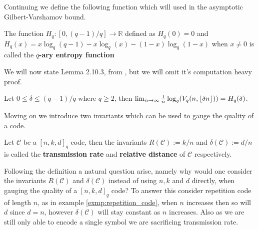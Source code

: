 Continuing we define the following function which will used in the asymptotic Gilbert-Varshamov bound.
\begin{definition}
  The function $H_q: [0, (q - 1)/q] \to \mathbb{R}$ defined as $H_q(0) = 0$ and $H_q(x) = x \log_{q}(q-1) - x \log_{q}(x) - (1-x)\log_q(1 - x)$ when $x \neq 0$ is called the \textbf{$q$-ary entropy function}
\end{definition}
We will now state Lemma 2.10.3, from \cite{huffman}, but we will omit it's computation heavy proof.
\begin{lemma}\label{lem:entropy_limit}
  Let $0 \leq \delta \leq (q - 1) / q$ where $q \geq 2$, then $\lim_{n \to \infty} \frac{1}{n} \log_q(V_q(n, \lfloor\delta n\rfloor)) = H_q(\delta)$.
\end{lemma}


Moving on we introduce two invariants which can be used to gauge the quality of a code.
\begin{definition}
Let $\mathcal{C}$ be a $[n, k, d]_q$ code, then the invariants $R(\mathcal{C}):= k / n$ and $\delta(\mathcal{C}):= d / n$ is called the \textbf{transmission rate} and \textbf{relative distance} of $\mathcal{C}$ respectively.
\end{definition}
Following the definition a natural question arise, namely why would one consider the invariants $R(\mathcal{C})$ and $\delta(\mathcal{C})$ instead of using $n, k$ and $d$ directly, when gauging the quality of a $[n,k,d]_q$ code? To answer this consider repetition code of length $n$, as in example \ref{exmp:repetition_code}, when $n$ increases then so will $d$ since $d = n$, however $\delta(\mathcal{C})$ will stay constant as $n$ increases. Also as we are still only able to encode a single symbol we are sacrificing transmission rate.

